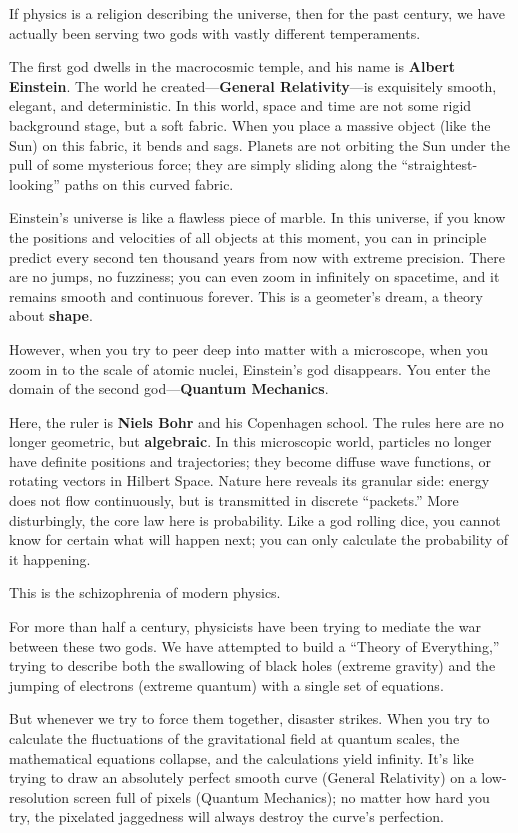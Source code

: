 \documentclass[11pt,a4paper,twoside]{book}
\begin{document}
If physics is a religion describing the universe, then for the past century, we have actually been serving two gods with vastly different temperaments.

The first god dwells in the macrocosmic temple, and his name is \textbf{Albert Einstein}. The world he created---\textbf{General Relativity}---is exquisitely smooth, elegant, and deterministic. In this world, space and time are not some rigid background stage, but a soft fabric. When you place a massive object (like the Sun) on this fabric, it bends and sags. Planets are not orbiting the Sun under the pull of some mysterious force; they are simply sliding along the ``straightest-looking'' paths on this curved fabric.

Einstein's universe is like a flawless piece of marble. In this universe, if you know the positions and velocities of all objects at this moment, you can in principle predict every second ten thousand years from now with extreme precision. There are no jumps, no fuzziness; you can even zoom in infinitely on spacetime, and it remains smooth and continuous forever. This is a geometer's dream, a theory about \textbf{shape}.

However, when you try to peer deep into matter with a microscope, when you zoom in to the scale of atomic nuclei, Einstein's god disappears. You enter the domain of the second god---\textbf{Quantum Mechanics}.

Here, the ruler is \textbf{Niels Bohr} and his Copenhagen school. The rules here are no longer geometric, but \textbf{algebraic}. In this microscopic world, particles no longer have definite positions and trajectories; they become diffuse wave functions, or rotating vectors in Hilbert Space. Nature here reveals its granular side: energy does not flow continuously, but is transmitted in discrete ``packets.'' More disturbingly, the core law here is probability. Like a god rolling dice, you cannot know for certain what will happen next; you can only calculate the probability of it happening.

This is the schizophrenia of modern physics.

For more than half a century, physicists have been trying to mediate the war between these two gods. We have attempted to build a ``Theory of Everything,'' trying to describe both the swallowing of black holes (extreme gravity) and the jumping of electrons (extreme quantum) with a single set of equations.

But whenever we try to force them together, disaster strikes. When you try to calculate the fluctuations of the gravitational field at quantum scales, the mathematical equations collapse, and the calculations yield infinity. It's like trying to draw an absolutely perfect smooth curve (General Relativity) on a low-resolution screen full of pixels (Quantum Mechanics); no matter how hard you try, the pixelated jaggedness will always destroy the curve's perfection.
\end{document}
